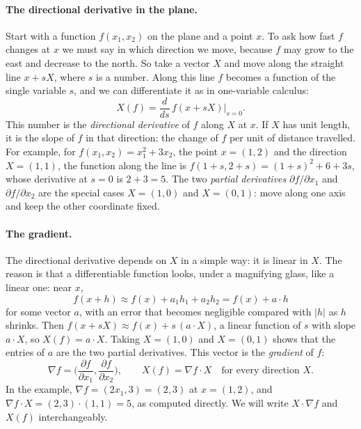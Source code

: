 \paragraph{The directional derivative in the plane.} Start with a function $f(x_1, x_2)$ on the plane and a point $x$. To ask how fast $f$ changes at $x$ we must say in which direction we move, because $f$ may grow to the east and decrease to the north. So take a vector $X$ and move along the straight line $x + sX$, where $s$ is a number. Along this line $f$ becomes a function of the single variable $s$, and we can differentiate it as in one-variable calculus:
\begin{equation}
\label{eqn:t1_dirderiv}
X(f) = \frac{d}{ds}\, f(x + sX) \Big|_{s = 0} .
\end{equation}
This number is the \emph{directional derivative} of $f$ along $X$ at $x$. If $X$ has unit length, it is the slope of $f$ in that direction: the change of $f$ per unit of distance travelled. For example, for $f(x_1, x_2) = x_1^2 + 3x_2$, the point $x = (1, 2)$ and the direction $X = (1, 1)$, the function along the line is $f(1 + s, 2 + s) = (1 + s)^2 + 6 + 3s$, whose derivative at $s = 0$ is $2 + 3 = 5$. The two \emph{partial derivatives} $\partial f/\partial x_1$ and $\partial f/\partial x_2$ are the special cases $X = (1, 0)$ and $X = (0, 1)$: move along one axis and keep the other coordinate fixed.

\paragraph{The gradient.} The directional derivative depends on $X$ in a simple way: it is linear in $X$. The reason is that a differentiable function looks, under a magnifying glass, like a linear one: near $x$,
\begin{equation*}
f(x + h) \approx f(x) + a_1 h_1 + a_2 h_2 = f(x) + a \cdot h
\end{equation*}
for some vector $a$, with an error that becomes negligible compared with $|h|$ as $h$ shrinks. Then $f(x + sX) \approx f(x) + s\, (a\cdot X)$, a linear function of $s$ with slope $a\cdot X$, so $X(f) = a\cdot X$. Taking $X = (1, 0)$ and $X = (0, 1)$ shows that the entries of $a$ are the two partial derivatives. This vector is the \emph{gradient} of $f$:
\begin{equation}
\label{eqn:t1_gradient}
\nabla f = \Big( \frac{\partial f}{\partial x_1}, \frac{\partial f}{\partial x_2} \Big), \qquad X(f) = \nabla f \cdot X \quad \text{for every direction } X.
\end{equation}
In the example, $\nabla f = (2x_1, 3) = (2, 3)$ at $x = (1, 2)$, and $\nabla f\cdot X = (2, 3)\cdot(1, 1) = 5$, as computed directly. We will write $X\cdot\nabla f$ and $X(f)$ interchangeably.

